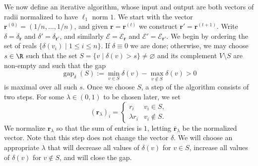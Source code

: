 We now define an iterative algorithm, whose input and output are both vectors of radii normalized to have $\ell_1$ norm $1$. We start with the vector $\mathbf r^{(0)}=(1/n,\ldots,1/n)$, and given $\mathbf r=\mathbf r^{(t)}$ we construct $\mathbf r'=\mathbf r^{(t+1)}$. Write $\delta=\delta_{\mathbf r}$ and $\delta'=\delta_{\mathbf r'}$, and similarly $\mathcal E=\mathcal E_{\mathbf r}$ and $\mathcal E'=\mathcal E_{\mathbf r'}$. We begin by ordering the set of reals $\{\delta(v_i)\mid1\le i\le n\}$. If $\delta\equiv0$ we are done; otherwise, we may choose $s\in\R$ such that the set $S=\{v\mid\delta(v)>s\}\ne\varnothing$ and its complement $V\setminus S$ are non-empty and such that the gap
\[
\operatorname{gap}_{\delta}(S):=\min_{v\in S}\delta(v)-\max_{v\notin S}\delta(v)>0
\]
is maximal over all such $s$. Once we choose $S$, a step of the algorithm consists of two steps. For some $\lambda\in(0,1)$ to be chosen later, we set
\[
(\mathbf r_\lambda)_i=\begin{cases}r_i&v_i\in S,\\\lambda r_i&v_i\notin S.\end{cases}
\]
We normalize $\mathbf r_\lambda$ so that the sum of entries is $1$, letting $\bar{\mathbf r}_\lambda$ be the normalized vector. Note that this step does not change the vector $\delta$. We will choose an appropriate $\lambda$ that will decrease all values of $\delta(v)$ for $v\in S$, increase all values of $\delta(v)$ for $v\notin S$, and will close the gap.

